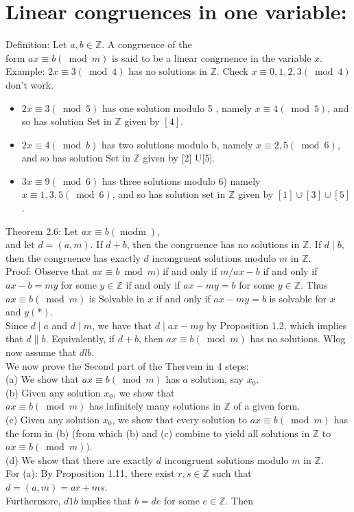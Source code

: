 \documentclass[10pt]{article}
\begin{document}
\section*{Linear congruences in one variable:}
Definition: Let $a, b \in \mathbb{Z}$. A congruence of the\\
form $a x \equiv b(\bmod m)$ is said to be a linear congrnence in the variable $x$.\\
Example: $2 x \equiv 3(\bmod 4)$ has no solutions in $\mathbb{Z}$. Check $x \equiv 0,1,2,3(\bmod 4)$ don't work.

\begin{itemize}
  \item $2 x \equiv 3(\bmod 5)$ has one solution modulo 5 , namely $x \equiv 4(\bmod 5)$, and so has solution Set in $\mathbb{Z}$ given by $[4]$.
  \item $2 x \equiv 4(\bmod b)$ has two solutions modulo b, namely $x \equiv 2,5(\bmod 6)$, and so has solution Set in $\mathbb{Z}$ given by [2] U[5].
  \item $3 x \equiv 9(\bmod 6)$ has three solutions modulo 6) namely $x \equiv 1,3,5(\bmod 6)$, and so has solution set in $\mathbb{Z}$ given by $[1] \cup[3] \cup[5]$.
\end{itemize}

Theorem 2.6: Let $a x \equiv b(\operatorname{modm})$,\\
and let $d=(a, m)$. If $d+b$, then the congruence has no solutions in $\mathbb{Z}$. If $d \mid b$, then the congruence has exactly $d$ incongruent solutions modulo $m$ in $\mathbb{Z}$.\\
Proof: Observe that $a x \equiv b \bmod m)$ if and only if $m / a x-b$ if and only if $a x-b=m y$ for some $y \in \mathbb{Z}$ if and only if $a x-m y=b$ for some $y \in \mathbb{Z}$. Thus $a x \equiv b(\bmod m)$ is Solvable in $x$ if and only if $a x-m y=b$ is solvable for $x$ and $y(*)$.\\
Since $d \mid a$ and $d \mid m$, we have that $d \mid a x-m y$ by Proposition 1.2, which implies that $d \| b$. Equivalently, if $d+b$, then $a x \equiv b(\bmod m)$ has no solutions. Wlog now assume that $d l b$.\\
We now prove the Second part of the Thervem in 4 steps:\\
(a) We show that $a x \equiv b(\bmod m)$ has $a$ solution, say $x_{0}$.\\
(b) Given any solution $x_{0}$, we show that\\
$a x \equiv b(\bmod m)$ has infinitely many solutions in $\mathbb{Z}$ of a given form.\\
(c) Given any solution $x_{0}$, we show that every solution to $a x \equiv b(\bmod m)$ has the form in (b) (from which (b) and (c) combine to yield all solutions in $\mathbb{Z}$ to $a x \equiv b(\bmod m))$.\\
(d) We show that there are exactly $d$ incongruent solutions modulo $m$ in $\mathbb{Z}$.\\
For (a): By Proposition 1.11, there exist $r, s \in \mathbb{Z}$ such that $d=(a, m)=a r+m s$.\\
Furthermore, $d 1 b$ implies that $b=d e$ for some $e \in \mathbb{Z}$. Then
\end{document}
